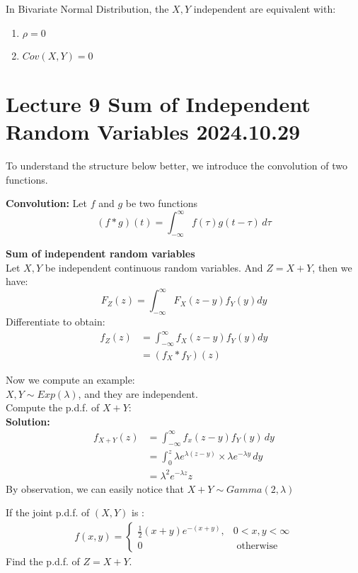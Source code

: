 \documentclass{article}
\begin{document}
\begin{theorem}
    In Bivariate Normal Distribution, the $X,Y$ independent are equivalent with:
    \begin{enumerate}
        \item $\rho = 0$
        \item $Cov(X,Y) = 0$
    \end{enumerate}
\end{theorem}
\section{Lecture 9 Sum of Independent Random Variables 2024.10.29}
To understand the structure below better, we introduce the convolution of two functions. 
\begin{definition}
    \textbf{Convolution:}
    Let $f$ and $g$ be two functions 
    \begin{equation}
    (f * g)(t) = \int_{-\infty}^{\infty} f(\tau) g(t - \tau) \, d\tau
    \end{equation}
\end{definition}
\begin{theorem}
    \textbf{Sum of independent random variables}\\
    Let $X,Y$ be independent continuous random variables. And $Z = X + Y$, then we have:
    \begin{equation*}
        F_Z(z) = \int^\infty_{-\infty}F_X(z-y)f_Y(y) dy
    \end{equation*}
    Differentiate to obtain:
    \begin{align*}
        f_Z(z) &= \int^\infty_{-\infty}f_X(z-y)f_Y(y) dy \\
               &= (f_X * f_Y)(z)
    \end{align*}
\end{theorem}
Now we compute an example:\\
$X,Y \sim Exp(\lambda)$, and they are independent.\\
Compute the p.d.f. of $X+Y$: \\
\textbf{Solution:}
\begin{align*}
    f_{X+Y}(z)  &= \int^\infty_{-\infty}f_x(z-y)f_Y(y) \, dy \\
                &= \int^z_{0}\lambda e^{\lambda(z-y)} \times \lambda e^{-\lambda y} \, dy \\
                &= \lambda^2 e^{-\lambda z} z
\end{align*}
By observation, we can easily notice that $X + Y \sim Gamma(2, \lambda)$
\begin{quiz}
    If the joint p.d.f. of $(X,Y)$ is :
    \begin{align*}
        f(x,y) = 
        \begin{cases}
            \frac{1}{2}(x+y)e^{-(x+y)}, & 0 < x,y < \infty \\
            0 & \text{ otherwise}
        \end{cases}
    \end{align*}
    Find the p.d.f. of $Z = X+Y$.
\end{quiz}
\end{document}
